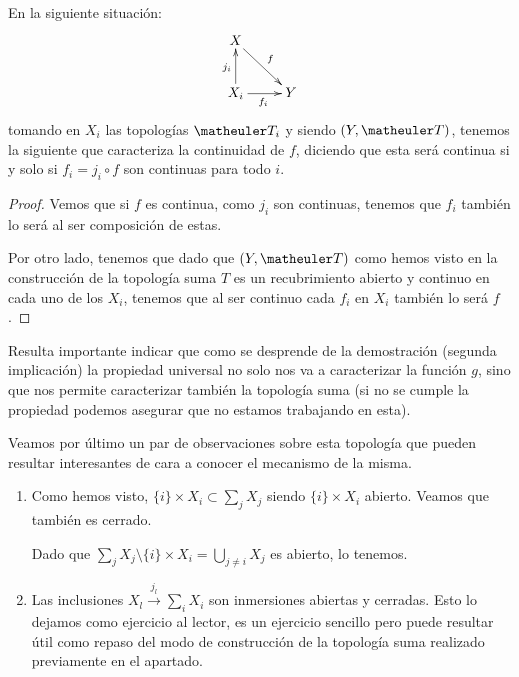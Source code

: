 \begin{lem}
	En la siguiente situación:
	\[\xymatrix{
		X \ar[rd]^f & \\
		X_i \ar[u]^{j_i} \ar[r]_{f_i} &
		Y
	}\]
	tomando en $X_i$ las topologías $\T_i$ y siendo $(Y,\T)$, tenemos la siguiente  que caracteriza la continuidad de $f$, diciendo que esta será continua si y solo si  $f_i=j_i\circ f$ son continuas para todo $i$.
	
	\begin{proof}
		Vemos que si $f$ es continua, como $j_i$ son continuas, tenemos que $f_i$ también lo será al ser composición de estas.
		
		Por otro lado, tenemos que dado que $(Y,\T)$ como hemos visto en la construcción de la topología suma $T$ es un recubrimiento abierto y continuo en cada uno de los $X_i$, tenemos que al ser continuo cada $f_i$ en $X_i$ también lo será $f$.
	\end{proof}
\end{lem}

Resulta importante indicar que como se desprende de la demostración (segunda implicación) la propiedad universal no solo nos va a caracterizar la función $g$, sino que nos permite caracterizar también la topología suma (si no se cumple la propiedad podemos asegurar que no estamos trabajando en esta). 

\begin{obs}
	Veamos por último un par de observaciones sobre esta topología que pueden resultar interesantes de cara a conocer el mecanismo de la misma.
	\begin{enumerate}
	\item Como hemos visto, $\{i\}\times X_i\subset\sum_j X_j$ siendo $\{i\}\times X_i$ abierto. Veamos que también es cerrado.
	
	Dado que $\sum_j X_j\setminus \{i\}\times X_i=\bigcup_{j\ne i }X_j$ es abierto, lo tenemos.
	
	\item Las inclusiones $X_l\stackrel{j_l}\longrightarrow\sum_iX_i$ son inmersiones abiertas y cerradas. Esto lo dejamos como ejercicio al lector, es un ejercicio sencillo pero puede resultar útil como repaso del modo de construcción de la topología suma realizado previamente en el apartado. \qedhere
\end{enumerate}
\end{obs}
